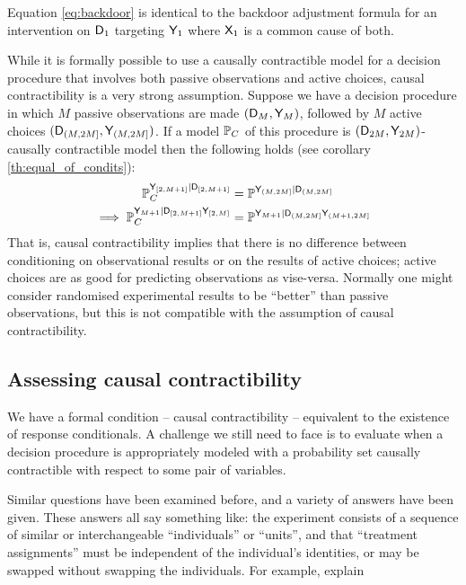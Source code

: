 Equation \ref{eq:backdoor} is identical to the backdoor adjustment formula for an intervention on $\mathsf{D}_1$ targeting $\mathsf{Y}_1$ where $\mathsf{X}_1$ is a common cause of both.

While it is formally possible to use a causally contractible model for a decision procedure that involves both passive observations and active choices, causal contractibility is a very strong assumption. Suppose we have a decision procedure in which $M$ passive observations are made $(\mathsf{D}_M,\mathsf{Y}_M)$, followed by $M$ active choices $(\mathsf{D}_{(M,2M]},\mathsf{Y}_{(M,2M]})$. If a model $\mathbb{P}_C$ of this procedure is $(\mathsf{D}_{2M},\mathsf{Y}_{2M})$-causally contractible model then the following holds (see corollary \ref{th:equal_of_condits}):
\begin{align}
    \mathbb{P}^{\mathsf{Y}_{[2,M+1]}|\mathsf{D}_{[2,M+1]}}_C &= \mathbb{P}^{\mathsf{Y}_{(M,2M]}|\mathsf{D}_{(M,2M]}}\\
    \implies \mathbb{P}^{\mathsf{Y}_{M+1}|\mathsf{D}_{[2,M+1]}\mathsf{Y}_{[2,M]}}_C &= \mathbb{P}^{\mathsf{Y}_{M+1}|\mathsf{D}_{(M,2M]}\mathsf{Y}_{(M+1,2M]}}
\end{align}
That is, causal contractibility implies that there is no difference between conditioning on observational results or on the results of active choices; active choices are as good for predicting observations as vise-versa. Normally one might consider randomised experimental results to be ``better'' than passive observations, but this is not compatible with the assumption of causal contractibility.

\subsection{Assessing causal contractibility}\label{ssec:assessing}

We have a formal condition -- causal contractibility -- equivalent to the existence of response conditionals. A challenge we still need to face is to evaluate when a decision procedure is appropriately modeled with a probability set causally contractible with respect to some pair of variables.

Similar questions have been examined before, and a variety of answers have been given. These answers all say something like: the experiment consists of a sequence of similar or interchangeable ``individuals'' or ``units'', and that ``treatment assignments'' must be independent of the individual's identities, or may be swapped without swapping the individuals. For example, \citet{greenland_identifiability_1986} explain

